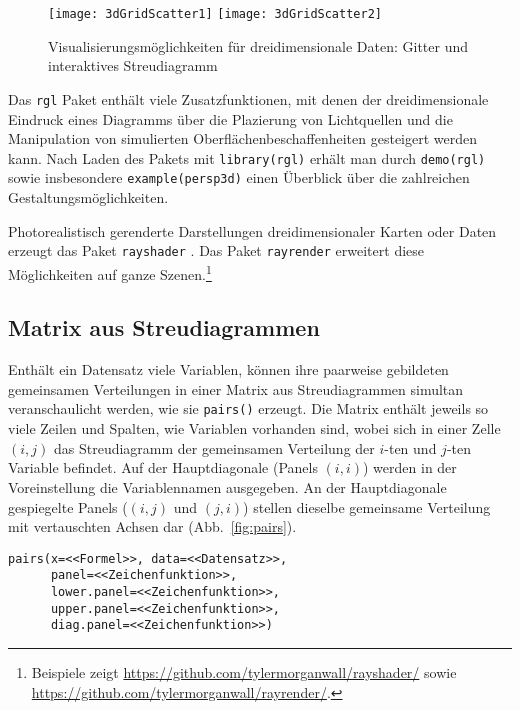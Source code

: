 \begin{figure}[ht]
\centering
\texttt{[image: 3dGridScatter1]}
\texttt{[image: 3dGridScatter2]}
\vspace*{-0.5em}
\caption{Visualisierungsmöglichkeiten für dreidimensionale Daten: Gitter und interaktives Streudiagramm}
\label{fig:3dTwo}
\end{figure}

Das \lstinline!rgl! Paket enthält viele Zusatzfunktionen, mit denen der dreidimensionale Eindruck eines Diagramms über die Plazierung von Lichtquellen und die Manipulation von simulierten Oberflächenbeschaffenheiten gesteigert werden kann. Nach Laden des Pakets mit \lstinline!library(rgl)! erhält man durch \lstinline!demo(rgl)! sowie insbesondere \lstinline!example(persp3d)! einen Überblick über die zahlreichen Gestaltungsmöglichkeiten.

Photorealistisch gerenderte Darstellungen dreidimensionaler Karten oder Daten erzeugt das Paket \lstinline!rayshader! \cite{MorganWall2019}. Das Paket  \lstinline!rayrender! \cite{MorganWall2024} erweitert diese Möglichkeiten auf ganze Szenen.\footnote{Beispiele zeigt \url{https://github.com/tylermorganwall/rayshader/} sowie \url{https://github.com/tylermorganwall/rayrender/}.}

\subsection{Matrix aus Streudiagrammen}
\label{sec:pairs}

Enthält ein Datensatz viele Variablen, können ihre paarweise gebildeten gemeinsamen Verteilungen in einer Matrix aus Streudiagrammen simultan veranschaulicht werden, wie sie \lstinline!pairs()! erzeugt. Die Matrix enthält jeweils so viele Zeilen und Spalten, wie Variablen vorhanden sind, wobei sich in einer Zelle $(i, j)$ das Streudiagramm der gemeinsamen Verteilung der $i$-ten und $j$-ten Variable befindet. Auf der Hauptdiagonale (Panels $(i, i)$) werden in der Voreinstellung die Variablennamen ausgegeben. An der Hauptdiagonale gespiegelte Panels ($(i, j)$ und $(j, i)$) stellen dieselbe gemeinsame Verteilung mit vertauschten Achsen dar (Abb.\ \ref{fig:pairs}).
\begin{lstlisting}
pairs(x=<<Formel>>, data=<<Datensatz>>,
      panel=<<Zeichenfunktion>>,
      lower.panel=<<Zeichenfunktion>>,
      upper.panel=<<Zeichenfunktion>>,
      diag.panel=<<Zeichenfunktion>>)
\end{lstlisting}


